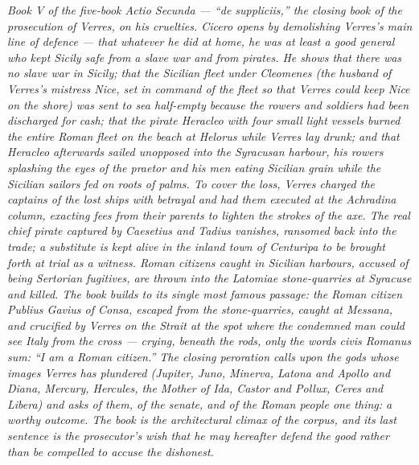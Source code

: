 
\textit{Book V of the five-book Actio Secunda --- ``de suppliciis,''
the closing book of the prosecution of Verres, on his cruelties.
Cicero opens by demolishing Verres's main line of defence ---
that whatever he did at home, he was at least a good general who
kept Sicily safe from a slave war and from pirates. He shows
that there was no slave war in Sicily; that the Sicilian fleet
under Cleomenes (the husband of Verres's mistress Nice, set in
command of the fleet so that Verres could keep Nice on the
shore) was sent to sea half-empty because the rowers and soldiers
had been discharged for cash; that the pirate Heracleo with four
small light vessels burned the entire Roman fleet on the beach
at Helorus while Verres lay drunk; and that Heracleo afterwards
sailed unopposed into the Syracusan harbour, his rowers
splashing the eyes of the praetor and his men eating Sicilian
grain while the Sicilian sailors fed on roots of palms. To cover
the loss, Verres charged the captains of the lost ships with
betrayal and had them executed at the Achradina column, exacting
fees from their parents to lighten the strokes of the axe. The
real chief pirate captured by Caesetius and Tadius vanishes,
ransomed back into the trade; a substitute is kept alive in the
inland town of Centuripa to be brought forth at trial as a
witness. Roman citizens caught in Sicilian harbours, accused of
being Sertorian fugitives, are thrown into the Latomiae
stone-quarries at Syracuse and killed. The book builds to its
single most famous passage: the Roman citizen Publius Gavius of
Consa, escaped from the stone-quarries, caught at Messana, and
crucified by Verres on the Strait at the spot where the
condemned man could see Italy from the cross --- crying, beneath
the rods, only the words \textit{civis Romanus sum}: ``I am a
Roman citizen.'' The closing peroration calls upon the gods
whose images Verres has plundered (Jupiter, Juno, Minerva,
Latona and Apollo and Diana, Mercury, Hercules, the Mother of
Ida, Castor and Pollux, Ceres and Libera) and asks of them, of
the senate, and of the Roman people one thing: a worthy outcome.
The book is the architectural climax of the corpus, and its
last sentence is the prosecutor's wish that he may hereafter
defend the good rather than be compelled to accuse the dishonest.}
